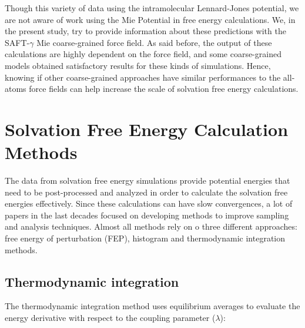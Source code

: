 Though this variety of data using the intramolecular Lennard-Jones potential, we are not aware of work using the Mie Potential in free energy calculations. We, in the present study, try to provide information about these predictions with the SAFT-$\gamma$ Mie coarse-grained force field.  As said before, the output of these calculations are highly dependent on the force field, and some coarse-grained models obtained satisfactory results for these kinds of simulations. Hence, knowing if other coarse-grained approaches have similar performances to the all-atoms force fields can help increase the scale of solvation free energy calculations. 

\section{Solvation Free Energy Calculation Methods}

The data from solvation free energy simulations provide potential energies that need to be post-processed and analyzed in order to calculate the solvation free energies effectively. Since these calculations can have slow convergences, a lot of papers in the last decades focused on developing methods to improve sampling and analysis techniques. Almost all methods rely on o three different approaches: free energy of perturbation (FEP), histogram and thermodynamic integration methods.

\subsection{Thermodynamic integration}

The thermodynamic integration method \cite{kirkwood1935} uses equilibrium averages to evaluate the energy derivative with respect to the coupling parameter ($\lambda$): 
%
%
%

